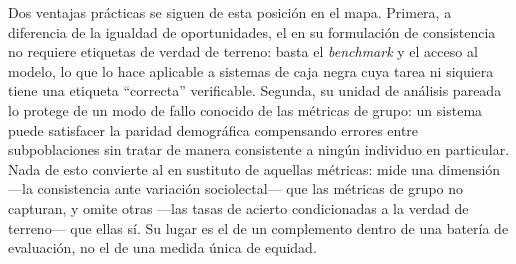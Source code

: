 Dos ventajas prácticas se siguen de esta posición en el mapa. Primera, a
diferencia de la igualdad de oportunidades, el \INS en su formulación de
consistencia no requiere etiquetas de verdad de terreno: basta el
\emph{benchmark} y el acceso al modelo, lo que lo hace aplicable a sistemas
de caja negra cuya tarea ni siquiera tiene una etiqueta ``correcta''
verificable. Segunda, su unidad de análisis pareada lo protege de un modo de
fallo conocido de las métricas de grupo: un sistema puede satisfacer la
paridad demográfica compensando errores entre subpoblaciones sin tratar de
manera consistente a ningún individuo en particular. Nada de esto convierte
al \INS en sustituto de aquellas métricas: mide una dimensión ---la
consistencia ante variación sociolectal--- que las métricas de grupo no
capturan, y omite otras ---las tasas de acierto condicionadas a la verdad de
terreno--- que ellas sí. Su lugar es el de un complemento dentro de una
batería de evaluación, no el de una medida única de equidad.
